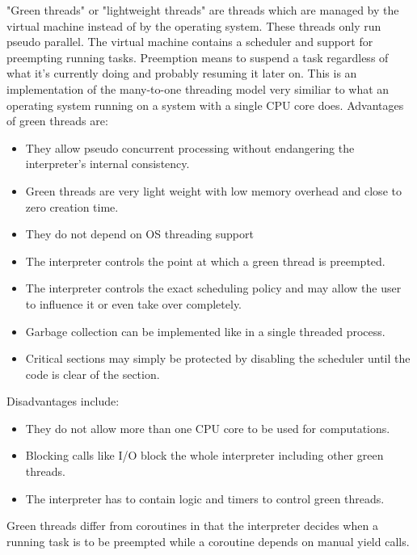 \documentclass[bachelor,english]{hgbthesis}
\begin{document}
"Green threads" or "lightweight threads" are threads which are managed by the virtual machine instead of by the operating system. These threads only run pseudo parallel. The virtual machine contains a scheduler and support for preempting running tasks.
Preemption means to suspend a task regardless of what it's currently doing and probably resuming it later on.
This is an implementation of the many-to-one threading model very similiar to what an operating system running on a system with a single CPU core does.
%
Advantages of green threads are:
%
\begin{itemize}
\item They allow pseudo concurrent processing without endangering the interpreter's internal consistency.
\item Green threads are very light weight with low memory overhead and close to zero creation time.
\item They do not depend on OS threading support
\item The interpreter controls the point at which a green thread is preempted.
\item The interpreter controls the exact scheduling policy and may allow the user to influence it or even take over completely.
\item Garbage collection can be implemented like in a single threaded process.
\item Critical sections may simply be protected by disabling the scheduler until the code is clear of the section.
\end{itemize}
%
Disadvantages include:
%
\begin{itemize}
\item They do not allow more than one CPU core to be used for computations.
\item Blocking calls like I/O block the whole interpreter including other green threads.
\item The interpreter has to contain logic and timers to control green threads.
\end{itemize}

Green threads differ from coroutines in that the interpreter decides when a running task is to be preempted while a coroutine depends on manual yield calls.
\end{document}
